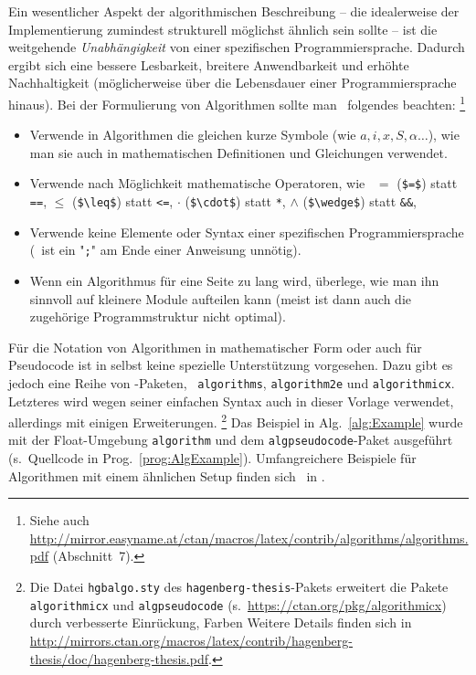 Ein wesentlicher Aspekt der algorithmischen Beschreibung -- die idealerweise der Implementierung 
zumindest strukturell möglichst ähnlich sein sollte -- ist die weitgehende
\emph{Unabhängigkeit} von einer spezifischen Programmiersprache.
Dadurch ergibt sich eine bessere Lesbarkeit, breitere Anwendbarkeit und erhöhte Nachhaltigkeit
(möglicherweise über die Lebensdauer einer Programmiersprache hinaus).
Bei der Formulierung von Algorithmen sollte man \ua\ folgendes beachten:%
\footnote{Siehe auch \url{http://mirror.easyname.at/ctan/macros/latex/contrib/algorithms/algorithms.pdf}
(Abschnitt~7).}
\begin{itemize}
\item
Verwende in Algorithmen die gleichen kurze Symbole (wie $a, i, x, S, \alpha \ldots$), wie man sie auch in mathematischen Definitionen und Gleichungen verwendet.
\item
Verwende nach Möglichkeit mathematische Operatoren, wie \zB\
$=$	 (\verb!$=$!) statt \texttt{==},
$\leq$ (\verb!$\leq$!) statt \texttt{<=},
$\cdot$ (\verb!$\cdot$!) statt \texttt{*},
$\wedge$ (\verb!$\wedge$!) statt \texttt{\&\&},
\usw
\item
Verwende keine Elemente oder Syntax einer spezifischen Programmiersprache
(\zB\ ist ein "\texttt{;}" am Ende einer Anweisung unnötig).
\item
Wenn ein Algorithmus für eine Seite zu lang wird, überlege, wie man ihn
sinnvoll auf kleinere Module aufteilen kann (meist ist dann auch die zugehörige
Programmstruktur nicht optimal).
\end{itemize}


Für die Notation von Algorithmen in mathematischer Form oder auch für
Pseudo\-code ist in \latex selbst keine spezielle Unterstützung vorgesehen.
Dazu gibt es jedoch eine Reihe von \latex-Paketen, \zB\ \texttt{algorithms}, 
\texttt{algorithm2e} und \texttt{algorithmicx}.
Letzteres wird wegen seiner einfachen Syntax auch in dieser Vorlage verwendet, 
allerdings mit einigen Erweiterungen.%
\footnote{Die Datei \nolinkurl{hgbalgo.sty} des \texttt{hagenberg-thesis}-Pakets erweitert die Pakete
\texttt{algorithmicx} und \texttt{algpseudocode} (s.\ \url{https://ctan.org/pkg/algorithmicx})
durch verbesserte Einrückung, Farben \etc  Weitere Details finden sich in 
\url{http://mirrors.ctan.org/macros/latex/contrib/hagenberg-thesis/doc/hagenberg-thesis.pdf}.}
Das Beispiel in Alg.~\ref{alg:Example} wurde mit der Float-Umgebung \texttt{algorithm} 
und dem \texttt{algpseudocode}-Paket ausgeführt (s.\ Quellcode in Prog.\ \ref{prog:AlgExample}).
Umfangreichere Beispiele für Algorithmen mit einem ähnlichen Setup finden sich \zB\ in 
\cite{BurgerBurge2015}.

